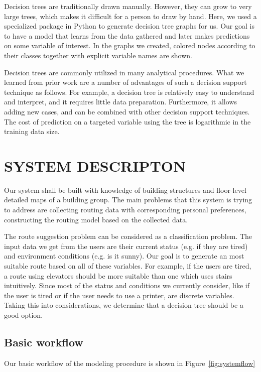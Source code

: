 \documentclass{sigchi}
\begin{document}
Decision trees are traditionally drawn manually. However, they can grow to very large trees, which makes it difficult for a person to draw by hand. Here, we used a specialized package in Python to generate decision tree graphs for us. Our goal is to have a model that learns from the data gathered and later makes predictions on some variable of interest. In the graphs we created, colored nodes according to their classes together with explicit variable names are shown. 


Decision trees are commonly utilized in many analytical procedures. What we learned from prior work are a number of advantages of such a decision support technique as follows. For example, a decision tree is relatively easy to understand and interpret, and it requires little data preparation. Furthermore, it allows adding new cases, and can be combined with other decision support techniques. The cost of prediction on a targeted variable using the tree is logarithmic in the training data size.

\section{SYSTEM DESCRIPTON}

Our system shall be built with knowledge of building structures and floor-level detailed maps of a building group. The main problems that this system is trying to address are collecting routing data with corresponding personal preferences, constructing the routing model based on the collected data. 


The route suggestion problem can be considered as a classification problem. The input data we get from the users are their current status (e.g. if they are tired) and environment conditions (e.g. is it sunny). Our goal is to generate an most suitable route based on all of these variables. For example, if the users are tired, a route using elevators should be more suitable than one which uses stairs intuitively. Since most of the status and conditions we currently consider, like if the user is tired or if the user needs to use a printer, are discrete variables. Taking this into considerations, we determine that a decision tree should be a good option.


\subsection{Basic workflow}

Our basic workflow of the modeling procedure is shown in Figure~\ref{fig:systemflow}
\end{document}

